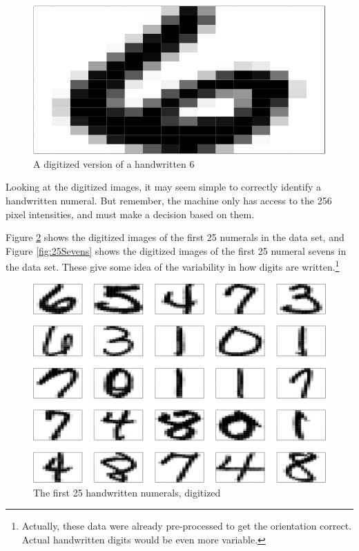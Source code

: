 \documentclass[]{krantz}
\begin{document}
\begin{figure}
\centering
\includegraphics{bookdown_files/figure-latex/digit-1.pdf}
\caption{\label{fig:digit}A digitized version of a handwritten 6}
\end{figure}

Looking at the digitized images, it may seem simple to correctly identify a handwritten numeral. But remember, the machine only has access to the 256 pixel intensities, and must make a decision based on them.

Figure \ref{fig:25digits} shows the digitized images of the first 25 numerals in the data set, and Figure \ref{fig:25Sevens} shows the digitized images of the first 25 numeral sevens in the data set. These give some idea of the variability in how digits are written.\footnote{Actually, these data were already pre-processed to get the orientation correct. Actual handwritten digits would be even more variable.}

\begin{figure}
\centering
\includegraphics{bookdown_files/figure-latex/25digits-1.pdf}
\caption{\label{fig:25digits}The first 25 handwritten numerals, digitized}
\end{figure}
\end{document}
